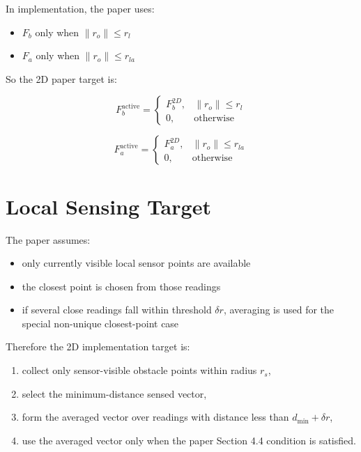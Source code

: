\documentclass[11pt]{article}
\begin{document}
In implementation, the paper uses:

\begin{itemize}[leftmargin=*]
  \item \(F_b\) only when \(\lVert r_o \rVert \le r_l\)
  \item \(F_a\) only when \(\lVert r_o \rVert \le r_{la}\)
\end{itemize}

So the 2D paper target is:

\begin{equation}
F_b^{\text{active}} =
\begin{cases}
F_b^{2D}, & \lVert r_o \rVert \le r_l \\
0, & \text{otherwise}
\end{cases}
\end{equation}

\begin{equation}
F_a^{\text{active}} =
\begin{cases}
F_a^{2D}, & \lVert r_o \rVert \le r_{la} \\
0, & \text{otherwise}
\end{cases}
\end{equation}

\section*{Local Sensing Target}

The paper assumes:

\begin{itemize}[leftmargin=*]
  \item only currently visible local sensor points are available
  \item the closest point is chosen from those readings
  \item if several close readings fall within threshold \(\delta r\), averaging
  is used for the special non-unique closest-point case
\end{itemize}

Therefore the 2D implementation target is:

\begin{enumerate}[leftmargin=*]
  \item collect only sensor-visible obstacle points within radius \(r_s\),
  \item select the minimum-distance sensed vector,
  \item form the averaged vector over readings with distance less than
  \(d_{\min} + \delta r\),
  \item use the averaged vector only when the paper Section 4.4 condition is satisfied.
\end{enumerate}
\end{document}
